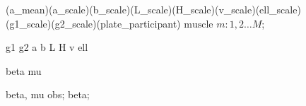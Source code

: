 \documentclass[a4paper,12pt]{article}
\begin{document}
\begin{figure}[H]
{        %
         {(a_mean)(a_scale)(b_scale)(L_scale)(H_scale)(v_scale)(ell_scale)(g1_scale)(g2_scale)(plate_participant)} {$\text{muscle }m : 1, 2 \ldots M$};

         {g1}
         {g2}
         {a}
         {b}
         {L}
         {H}
         {v}
         {ell}

         {beta}
         {mu}

         {beta, mu}
         {obs};
         {beta};
    }
\end{figure}
\end{document}
